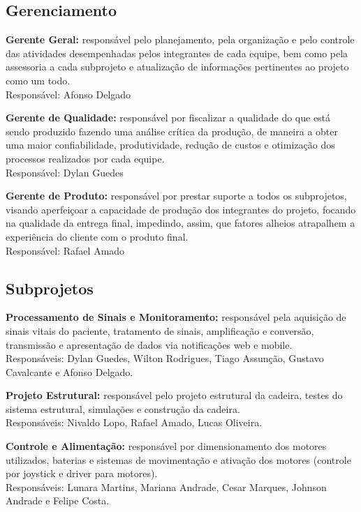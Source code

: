 \subsection{Gerenciamento}

\textbf{Gerente Geral:} responsável pelo planejamento, pela organização e pelo controle das atividades desempenhadas pelos integrantes de cada equipe, bem como pela assessoria a cada subprojeto e atualização de informações pertinentes ao projeto como um todo.
\\Responsável: Afonso Delgado

\textbf{Gerente de Qualidade:} responsável por fiscalizar a qualidade do que está sendo produzido fazendo uma análise crítica da produção, de maneira a obter uma maior confiabilidade, produtividade, redução de custos e otimização dos processos realizados por cada equipe.
\\Responsável: Dylan Guedes

\textbf{Gerente de Produto:} responsável por prestar suporte a todos os subprojetos, visando aperfeiçoar a capacidade de produção dos integrantes do projeto, focando na qualidade da entrega final, impedindo, assim,  que fatores alheios atrapalhem a experiência do cliente com o produto final.
\\Responsável: Rafael Amado

\subsection{Subprojetos}

\textbf{Processamento de Sinais e Monitoramento:} responsável pela aquisição de sinais vitais do paciente,
tratamento de sinais, amplificação e conversão, transmissão e apresentação de
dados via notificações web e mobile.
\\Responsáveis: Dylan Guedes, Wilton Rodrigues, Tiago Assunção, Gustavo Cavalcante e Afonso Delgado.

\textbf{Projeto Estrutural:} responsável pelo projeto estrutural da cadeira, testes
do sistema estrutural, simulações e construção da cadeira.
\\Responsáveis: Nivaldo Lopo, Rafael Amado, Lucas Oliveira.

\textbf{Controle e Alimentação:} responsável por dimensionamento dos motores utilizados,
baterias e sistemas de movimentação e ativação dos motores (controle por
joystick e driver para motores).
\\Responsáveis: Lunara Martins, Mariana Andrade, Cesar Marques, Johnson Andrade e Felipe Costa.

